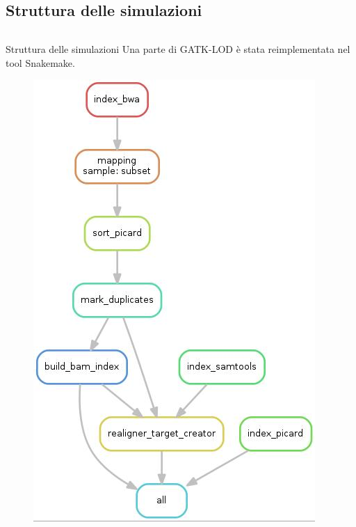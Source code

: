 \documentclass{beamer}
\begin{document}
\subsection{Struttura delle simulazioni}
\begin{frame}
\begin{columns}
\begin{column}{0.8\linewidth}	
\begin{block}{Struttura delle simulazioni}
Una parte di GATK-LOD è stata reimplementata nel tool Snakemake.
\begin{figure}[H]
\centering
\includegraphics[scale=0.3]{Workflow.jpg}
\end{figure}
\end{block}
\end{column}
\end{columns}
\end{frame}
\end{document}
